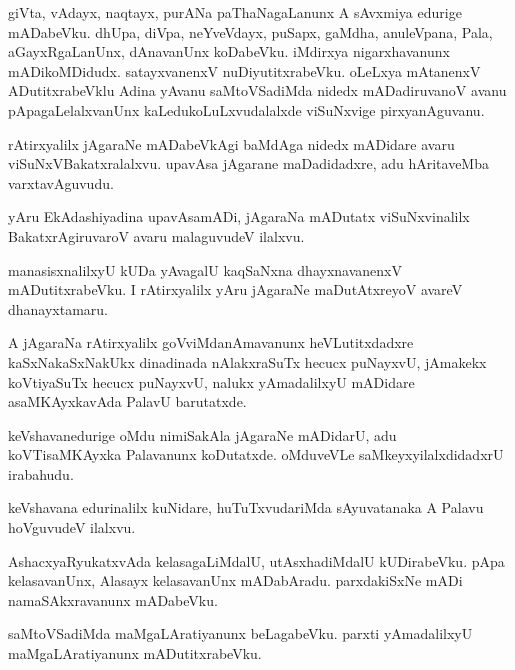 \documentclass{article}
\begin{document}
\begin{mn}%
giVta, vAdayx, naqtayx, purANa paThaNagaLanunx A sAvxmiya edurige mADabeVku. dhUpa, diVpa, 
neYveVdayx, puSapx, gaMdha, anuleVpana, Pala, aGayxRgaLanUnx, dAnavanUnx koDabeVku. iMdirxya 
nigarxhavanunx mADikoMDidudx. satayxvanenxV nuDiyutitxrabeVku. oLeLxya mAtanenxV ADutitxrabeVklu 
Adina yAvanu saMtoVSadiMda nidedx mADadiruvanoV avanu pApagaLelalxvanUnx kaLedukoLuLxvudalalxde 
viSuNxvige pirxyanAguvanu.
\end{mn}

\begin{mn}%
rAtirxyalilx jAgaraNe mADabeVkAgi baMdAga nidedx mADidare avaru viSuNxVBakatxralalxvu. upavAsa 
jAgarane maDadidadxre, adu hAritaveMba varxtavAguvudu.
\end{mn}

\begin{mn}%
yAru EkAdashiyadina upavAsamADi, jAgaraNa mADutatx viSuNxvinalilx BakatxrAgiruvaroV avaru 
malaguvudeV ilalxvu.
\end{mn}

\begin{mn}%
manasisxnalilxyU kUDa yAvagalU kaqSaNxna dhayxnavanenxV mADutitxrabeVku. I rAtirxyalilx yAru 
jAgaraNe maDutAtxreyoV avareV dhanayxtamaru.
\end{mn}

\begin{mn}%
A jAgaraNa rAtirxyalilx goVviMdanAmavanunx heVLutitxdadxre kaSxNakaSxNakUkx dinadinada nAlakxraSuTx 
hecucx puNayxvU, jAmakekx koVtiyaSuTx hecucx puNayxvU, nalukx yAmadalilxyU mADidare asaMKAyxkavAda 
PalavU barutatxde.
\end{mn}

\begin{mn}%
keVshavanedurige oMdu nimiSakAla jAgaraNe mADidarU, adu koVTisaMKAyxka Palavanunx koDutatxde. 
oMduveVLe saMkeyxyilalxdidadxrU irabahudu.
\end{mn}

\begin{mn}%
keVshavana edurinalilx kuNidare, huTuTxvudariMda sAyuvatanaka A Palavu hoVguvudeV ilalxvu.
\end{mn}

\begin{mn}%
AshacxyaRyukatxvAda kelasagaLiMdalU, utAsxhadiMdalU kUDirabeVku. pApa kelasavanUnx, Alasayx 
kelasavanUnx mADabAradu. parxdakiSxNe mADi namaSAkxravanunx mADabeVku.
\end{mn}

\begin{mn}%
saMtoVSadiMda maMgaLAratiyanunx beLagabeVku. parxti yAmadalilxyU maMgaLAratiyanunx mADutitxrabeVku.
\end{mn}
\end{document}
